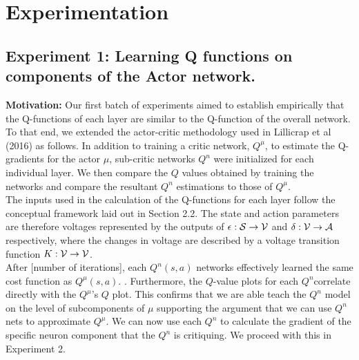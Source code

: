 \section{Experimentation}
\subsection{Experiment 1: Learning Q functions on components of the Actor network.}
\textbf{Motivation:}
Our first batch of experiments aimed to establish empirically that the Q-functions of each layer are similar to the Q-function of the overall network. To that end, we extended the actor-critic methodology used in Lillicrap et al (2016) as follows. In addition to training a critic network, $Q^\mu$, to estimate the Q-gradients for the actor $\mu$, sub-critic networks $Q^n$ were initialized for each individual layer. We then compare the $Q$ values obtained by training the networks and compare the resultant $Q^n$ estimations to those of $Q^\mu$. \\
\newline
The inputs used in the calculation of the Q-functions for each layer follow the conceptual framework laid out in Section 2.2. The state and action parameters are therefore voltages represented by the outputs of $\epsilon : {\mathcal S} \to {\mathcal V}$ and $\delta : {\mathcal V} \to {\mathcal A}$ respectively, where the changes in voltage are described by a voltage transition function $K : {\mathcal V} \to {\mathcal V}$. \\
\newline
After [number of iterations], each $Q^n(s,a)$  networks effectively learned the same cost function as $Q^{\mu}(s,a)$.
. Furthermore, the $Q$-value plots for each $Q^n$correlate directly with the  $Q^{\mu}$'s $Q$ plot. This confirms that we are able teach the $Q^n$ model on the level of subcomponents of $\mu$ supporting the argument that we can use $Q^n$ nets to approximate $Q^\mu$. We can now use each $Q^n$ to calculate the gradient of the specific neuron component that the $Q^n$ is critiquing. We proceed with this in Experiment 2.
